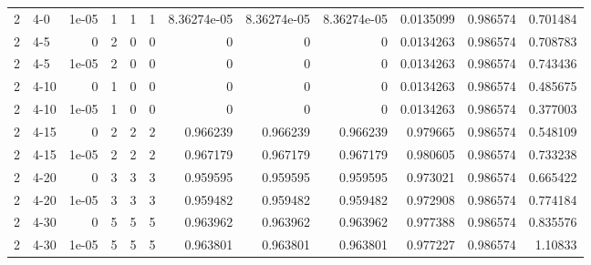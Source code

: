 \begin{tabular}{rlrrrrrrrrrr}
     2 & 4-0    &      1e-05 &           1 &                 1 &                 1 &     8.36274e-05 &     8.36274e-05 &      8.36274e-05 &        0.0135099 &               0.986574 &           0.701484 \\
     2 & 4-5    &      0     &           2 &                 0 &                 0 &     0           &     0           &      0           &        0.0134263 &               0.986574 &           0.708783 \\
     2 & 4-5    &      1e-05 &           2 &                 0 &                 0 &     0           &     0           &      0           &        0.0134263 &               0.986574 &           0.743436 \\
     2 & 4-10   &      0     &           1 &                 0 &                 0 &     0           &     0           &      0           &        0.0134263 &               0.986574 &           0.485675 \\
     2 & 4-10   &      1e-05 &           1 &                 0 &                 0 &     0           &     0           &      0           &        0.0134263 &               0.986574 &           0.377003 \\
     2 & 4-15   &      0     &           2 &                 2 &                 2 &     0.966239    &     0.966239    &      0.966239    &        0.979665  &               0.986574 &           0.548109 \\
     2 & 4-15   &      1e-05 &           2 &                 2 &                 2 &     0.967179    &     0.967179    &      0.967179    &        0.980605  &               0.986574 &           0.733238 \\
     2 & 4-20   &      0     &           3 &                 3 &                 3 &     0.959595    &     0.959595    &      0.959595    &        0.973021  &               0.986574 &           0.665422 \\
     2 & 4-20   &      1e-05 &           3 &                 3 &                 3 &     0.959482    &     0.959482    &      0.959482    &        0.972908  &               0.986574 &           0.774184 \\
     2 & 4-30   &      0     &           5 &                 5 &                 5 &     0.963962    &     0.963962    &      0.963962    &        0.977388  &               0.986574 &           0.835576 \\
     2 & 4-30   &      1e-05 &           5 &                 5 &                 5 &     0.963801    &     0.963801    &      0.963801    &        0.977227  &               0.986574 &           1.10833  \\

\end{tabular}
